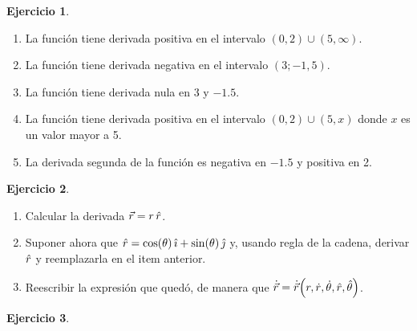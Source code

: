 \documentclass[a4paper,12pt,twoside]{book}
\newtheorem{ejercicio}{{Ejercicio}}[chapter]
\begin{document}
\begin{mdframed}[style=ejercicio-facil]
    \begin{ejercicio}
    \end{ejercicio}
    \begin{center}
        \def\svgwidth{0.3\linewidth}
        
    \end{center}
    \begin{enumerate}
        \item La función tiene derivada positiva en el intervalo $(0,2) \cup (5,\infty)$.
        \item La función tiene derivada negativa en el intervalo $(3;-1,5)$.
        \item La función tiene derivada nula en 3 y $-1.5$.
        \item La función tiene derivada positiva en el intervalo $(0,2) \cup (5,x)$ donde $x$ es un valor mayor a 5.
        \item La derivada segunda de la función es negativa en $-1.5$ y positiva en 2.
    \end{enumerate}
\end{mdframed}

\begin{mdframed}[style=ejercicio-facil]
    \begin{ejercicio}
    \end{ejercicio}
    \begin{enumerate}
        \item Calcular la derivada $\vec{r} = r \, \versor{r}$. %
        \item Suponer ahora que $\versor{r} = \cos(\theta) \, \iVer + \sin(\theta) \, \jVer$ y, usando regla de la cadena, derivar $\versor{r}$ y reemplazarla en el item anterior.
        \item Reescribir la expresión que quedó, de manera que $\dot{\vec{r}} = \fx[\dot{\vec{r}}]{r, \dot{r}, \dot{\theta}, \versor{r}, \versor{\theta}}$.
    \end{enumerate}
\end{mdframed}

\begin{mdframed}[style=ejercicio-facil]
    \begin{ejercicio}
    \end{ejercicio}
\end{mdframed}
\end{document}
